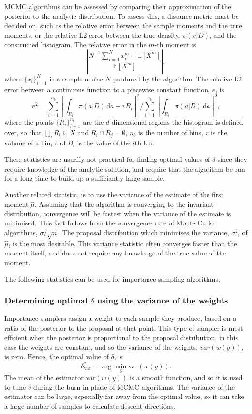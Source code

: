 \documentclass[final]{siamltex}
\begin{document}
MCMC algorithms can be assessed by comparing their approximation of the posterior to the analytic distribution. To assess this, a distance metric must be decided on, such as the relative error between the sample moments and the true moments, or the relative L2 error between the true density, $\pi(x|D)$, and the constructed histogram. The relative error in the $m$-th moment is
\[
	\left|\frac{N^{-1}\sum_{i=1}^N \! x_i^m - \mathbb{E}[X^m]}{\mathbb{E}[X^m]}\right|,
\]
where $\{x_i\}_{i=1}^N$ is a sample of size $N$ produced by the algorithm. The relative L2 error between a continuous function to a piecewise constant function, $e$, is
\begin{equation}\label{eqn:L2_error}
	e^2 = \sum\limits_{i=1}^{n_b}\left[\displaystyle\int_{R_i} \! \pi(a|D) \, \mbox{d}a - vB_i\right]^2 \Big/ \sum\limits_{i=1}^{n_b}\left[\displaystyle\int_{R_i} \! \pi(a|D) \, \mbox{d}a\right]^2,
\end{equation}
where the points $\{R_i\}_{i=1}^{n_b}$ are the $d$-dimensional regions the histogram is defined over, so that $\bigcup_i R_i \subseteq X$ and $R_i\cap R_j=\emptyset$, $n_b$ is the number of bins, $v$ is the volume of a bin, and $B_i$ is the value of the $i$th bin. 

These statistics are usually not practical for finding optimal values of $\delta$ since they require knowledge of the analytic solution, and require that the algorithm be run for a long time to build up a sufficiantly large sample.

Another related statistic, is to use the variance of the estimate of the first moment $\hat{\mu}$. Assuming that the algorithm is converging to the invariant distribution, convergence will be fastest when the variance of the estimate is minimised. This fact follows from the convergence rate of Monte Carlo algorithms, $\sigma/\sqrt{n}$. The proposal distribution which minimises the variance, $\sigma^2$, of $\hat{\mu}$, is the most desirable. This variance statistic often converges faster than the moment itself, and does not require any knowledge of the true value of the moment.

The following statistics can be used for importance sampling algorithms.

\subsubsection{Determining optimal $\delta$ using the variance of the weights}

Importance samplers assign a weight to each sample they produce, based on a ratio of the posterior to the proposal at that point. This type of sampler is most efficient when the posterior is proportional to the proposal distribution, in this case the weights are constant, and so the variance of the weights, $var(w(y))$, is zero. Hence, the optimal value of $\delta$, is
\[
	\delta^*_{\text{var}} = \arg\min_{\delta} \text{var}(w(y)).
\]
The mean of the estimator $\text{var}(w(y))$ is a smooth function, and so it is used to tune $\delta$ during the burn-in phase of MCMC algorithms. The variance of the estimator can be large, especially far away from the optimal value, so it can take a large number of samples to calculate descent directions.
\end{document}
